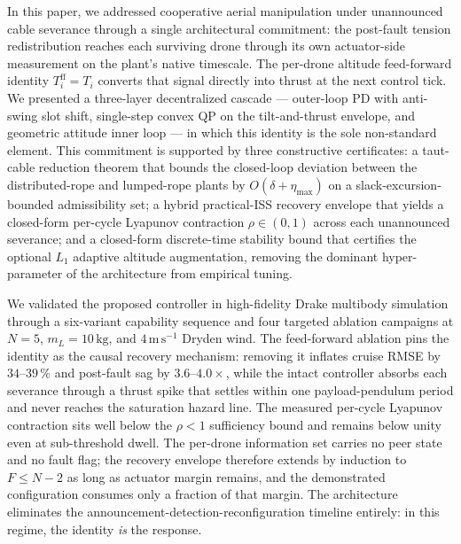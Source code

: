 In this paper, we addressed cooperative aerial manipulation under unannounced cable severance through a single architectural commitment: the post-fault tension redistribution reaches each surviving drone through its own actuator-side measurement on the plant's native timescale. The per-drone altitude feed-forward identity $T_i^{\mathrm{ff}}=T_i$ converts that signal directly into thrust at the next control tick. We presented a three-layer decentralized cascade --- outer-loop PD with anti-swing slot shift, single-step convex QP on the tilt-and-thrust envelope, and geometric attitude inner loop --- in which this identity is the sole non-standard element. This commitment is supported by three constructive certificates: a taut-cable reduction theorem that bounds the closed-loop deviation between the distributed-rope and lumped-rope plants by $O(\delta+\eta_{\max})$ on a slack-excursion-bounded admissibility set; a hybrid practical-ISS recovery envelope that yields a closed-form per-cycle Lyapunov contraction $\rho\in(0,1)$ across each unannounced severance; and a closed-form discrete-time stability bound that certifies the optional $L_1$ adaptive altitude augmentation, removing the dominant hyper-parameter of the architecture from empirical tuning.

We validated the proposed controller in high-fidelity Drake multibody simulation through a six-variant capability sequence and four targeted ablation campaigns at $N=5$, $m_L=10\,\mathrm{kg}$, and $4\,\mathrm{m\,s^{-1}}$ Dryden wind. The feed-forward ablation pins the identity as the causal recovery mechanism: removing it inflates cruise RMSE by $34$--$39\,\%$ and post-fault sag by $3.6$--$4.0\times$, while the intact controller absorbs each severance through a thrust spike that settles within one payload-pendulum period and never reaches the saturation hazard line. The measured per-cycle Lyapunov contraction sits well below the $\rho<1$ sufficiency bound and remains below unity even at sub-threshold dwell. The per-drone information set carries no peer state and no fault flag; the recovery envelope therefore extends by induction to $F\le N{-}2$ as long as actuator margin remains, and the demonstrated configuration consumes only a fraction of that margin. The architecture eliminates the announcement-detection-reconfiguration timeline entirely: in this regime, the identity \emph{is} the response.

